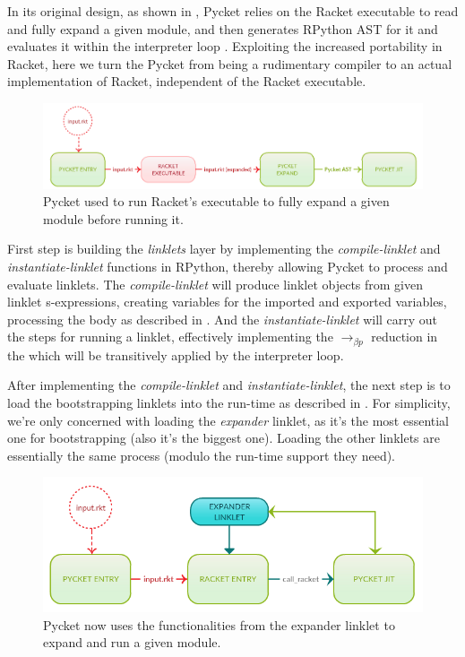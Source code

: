 In its original design, as shown in , Pycket
relies on the Racket executable to read and fully expand a given
module\cite{samth:11}, and then generates RPython AST for it and
evaluates it within the interpreter loop \cite{pycket15}. Exploiting
the increased portability in Racket, here we turn the Pycket from
being a rudimentary compiler to an actual implementation of Racket,
independent of the Racket executable.

\begin{figure}[h!]
  \centering \includegraphics[scale=0.3]{img/old-pycket-2}
\caption{Pycket used to run Racket's executable to fully expand a given module before running it.}
\label{fig:old-pycket}
\end{figure}

First step is building the \emph{linklets} layer by implementing the
\emph{compile-linklet} and \emph{instantiate-linklet} functions in
RPython, thereby allowing Pycket to process and evaluate linklets. The
\emph{compile-linklet} will produce linklet objects from given linklet
s-expressions, creating variables for the imported and exported
variables, processing the body as described in
. And the \emph{instantiate-linklet}
will carry out the steps for running a linklet, effectively
implementing the $\longrightarrow_{\beta p}$ reduction in the 
which will be transitively applied by the interpreter loop.

After implementing the \emph{compile-linklet} and
\emph{instantiate-linklet}, the next step is to load the bootstrapping
linklets into the run-time as described in
. For simplicity, we're only concerned
with loading the \emph{expander} linklet, as it's the most essential
one for bootstrapping (also it's the biggest one). Loading the other
linklets are essentially the same process (modulo the run-time support
they need).

\begin{figure}[h!]
  \centering
\includegraphics[scale=0.3]{img/new-pycket}
\caption{Pycket now uses the functionalities from the expander linklet to expand and run a given module.}
\label{fig:new-pycket}
\end{figure}


